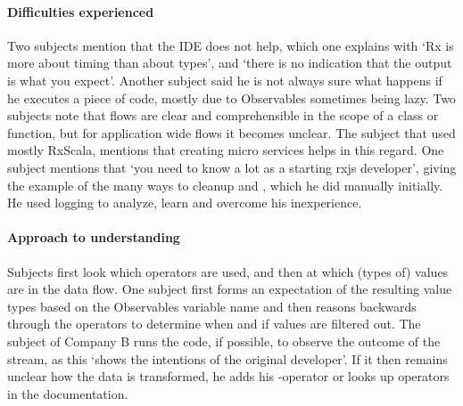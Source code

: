 \paragraph{Difficulties experienced}
Two subjects mention that the IDE does not help, which one explains with `Rx is more about timing than about types', and `there is no indication that the output is what you expect'. Another subject said he is not always sure what happens if he executes a piece of code, mostly due to Observables sometimes being lazy.
Two subjects note that flows are clear and comprehensible in the scope of a class or function, but for application wide flows it becomes unclear. The subject that used mostly RxScala, mentions that creating micro services helps in this regard. 
One subject mentions that `you need to know a lot as a starting {\lbrack}rxjs{\rbrack} developer', giving the example of the many ways to cleanup and , which he did manually initially. He used logging to analyze, learn and overcome his inexperience. 

\paragraph{Approach to understanding}
Subjects first look which operators are used, and then at which (types of) values are in the data flow. One subject first forms an expectation of the resulting value types based on the Observables variable name and then reasons backwards through the operators to determine when and if values are filtered out. The subject of Company B runs the code, if possible, to observe the outcome of the stream, as this `shows the intentions of the original developer'. If it then remains unclear how the data is transformed, he adds his -operator or looks up operators in the documentation.  

